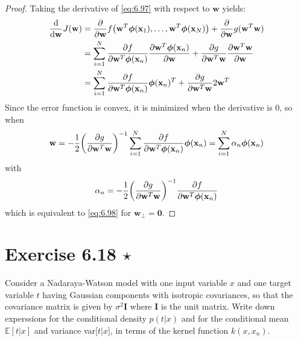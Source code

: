 \vspace{1em}

\begin{proof}
    Taking the derivative of \eqref{eq:6.97} with respect to $\mathbf{w}$ yields:
    \begin{align*}
        \dv{\mathbf{w}} J(\mathbf{w})
        &= \pdv{\mathbf{w}} 
        f\big(\mathbf{w}^T\bm{\phi}(\mathbf{x}_1), \ldots, \mathbf{w}^T\bm{\phi}(\mathbf{x}_N)\big)
        + \pdv{\mathbf{w}} g(\mathbf{w}^T \mathbf{w}) \\
        &= \sum_{i=1}^{N} \pdv{f}{\mathbf{w}^T \bm{\phi}(\mathbf{x}_n)} 
        \pdv{\mathbf{w}^T \bm{\phi}(\mathbf{x}_n)}{\mathbf{w}}
        + \pdv{g}{\mathbf{w}^T \mathbf{w}} \pdv{\mathbf{w}^T \mathbf{w}}{\mathbf{w}} \\
        &= \sum_{i=1}^{N} \pdv{f}{\mathbf{w}^T \bm{\phi}(\mathbf{x}_n)} 
        \bm{\phi}(\mathbf{x}_n)^T 
        + \pdv{g}{\mathbf{w}^T \mathbf{w}} 2\mathbf{w}^T
    \end{align*}
    Since the error function is convex, it is minimized when the derivative
    is 0, so when
    \[
        \mathbf{w}
        = -\frac{1}{2}\bigg(\pdv{g}{\mathbf{w}^T \mathbf{w}}\bigg)^{-1}
        \sum_{i=1}^{N} \pdv{f}{\mathbf{w}^T \bm{\phi}(\mathbf{x}_n)} 
        \bm{\phi}(\mathbf{x}_n)
        = \sum_{i=1}^{N} \alpha_n \bm{\phi}(\mathbf{x}_n)
    \] 
    with
    \[
        \alpha_n = 
        -\frac{1}{2}\bigg(\pdv{g}{\mathbf{w}^T \mathbf{w}}\bigg)^{-1}
        \pdv{f}{\mathbf{w}^T \bm{\phi}(\mathbf{x}_n)} 
    \] 
    which is equivalent to \eqref{eq:6.98} for $\mathbf{w}_\perp = \mathbf{0}$.
\end{proof}

\section*{Exercise 6.18 $\star$}
Consider a Nadaraya-Watson model with one input variable $x$ and one target variable
$t$ having Gaussian components with isotropic covariances,
so that the covariance matrix is given by  $\sigma^2\mathbf{I}$ where $\mathbf{I}$ is
the unit matrix. Write down experssions for the conditional density $p(t | x)$ and
for the conditional mean $\mathbb{E}[t | x]$ and variance var[$t | x$], in terms of the 
kernel function $k(x, x_n)$.

\vspace{1em}

